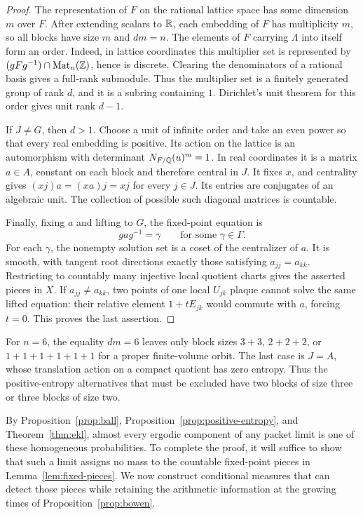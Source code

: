 \begin{proof}
The representation of $F$ on the rational lattice space has some
dimension $m$ over $F$. After extending scalars to $\mathbb R$, each embedding
of $F$ has multiplicity $m$, so all blocks have size $m$ and $dm=n$.
The elements of $F$ carrying $\Lambda$ into itself form an order.
Indeed, in lattice coordinates this multiplier set is represented by
$(gFg^{-1})\cap\operatorname{Mat}_n(\mathbb Z)$, hence is discrete. Clearing the denominators of a
rational basis gives a full-rank submodule. Thus the multiplier set is
a finitely generated group of rank $d$, and it is a subring containing $1$.
Dirichlet's unit theorem for this order gives unit rank $d-1$.

If $J\ne G$, then $d>1$. Choose a unit of infinite order and take an even
power so that every real embedding is positive. Its action on the
lattice is an automorphism with determinant
$N_{F/\mathbb Q}(u)^m=1$. In real coordinates it is a matrix $a\in A$,
constant on each block and therefore central in $J$. It fixes $x$,
and centrality gives $(xj)a=(xa)j=xj$ for every $j\in J$.
Its entries are conjugates of an algebraic unit. The collection of
possible such diagonal matrices is countable.

Finally, fixing $a$ and lifting to $G$, the fixed-point equation is
\[
 ga g^{-1}=\gamma\qquad\text{for some }\gamma\in\Gamma.
\]
For each $\gamma$, the nonempty solution set is a coset of the
centralizer of $a$. It is smooth, with tangent root directions exactly
those satisfying $a_{jj}=a_{kk}$. Restricting to countably many
injective local quotient charts gives the asserted pieces in $X$.
If $a_{jj}\ne a_{kk}$, two points of one local $U_{jk}$ plaque cannot
solve the same lifted equation: their relative element $1+tE_{jk}$
would commute with $a$, forcing $t=0$. This proves the last assertion.
\end{proof}

For $n=6$, the equality $dm=6$ leaves only block sizes $3+3$,
$2+2+2$, or $1+1+1+1+1+1$ for a proper finite-volume orbit.
The last case is $J=A$, whose translation action on a compact quotient
has zero entropy. Thus the positive-entropy alternatives that must be
excluded have two blocks of size three or three blocks of size two.

By Proposition~\ref{prop:ball}, Proposition~\ref{prop:positive-entropy},
and Theorem~\ref{thm:ekl}, almost every ergodic component of any packet
limit is one of these homogeneous probabilities. To complete the proof,
it will suffice to show that such a limit assigns no mass to the
countable fixed-point pieces in Lemma~\ref{lem:fixed-pieces}. We now
construct conditional measures that can detect those pieces while
retaining the arithmetic information at the growing times of
Proposition~\ref{prop:bowen}.
